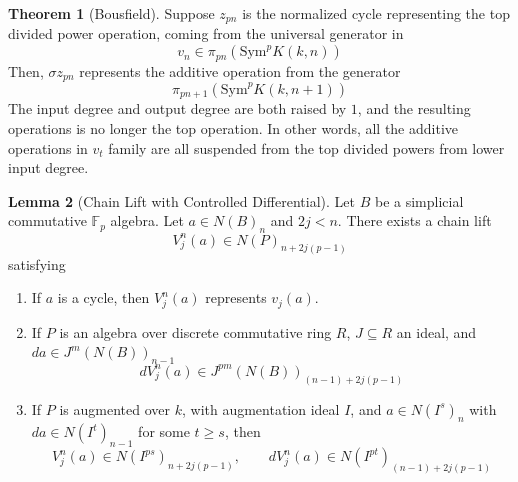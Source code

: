 \documentclass{article}
\newcommand{\Sym}{\textrm{Sym}}
\theoremstyle{definition}
\newtheorem{theorem}{Theorem}[section]
\theoremstyle{definition}
\theoremstyle{definition}
\theoremstyle{definition}
\theoremstyle{definition}
\theoremstyle{definition}
\newtheorem{lemma}[theorem]{Lemma}
\theoremstyle{definition}
\theoremstyle{definition}
\begin{document}
\begin{theorem}[Bousfield]
    \label{suspended}
    Suppose $z_{pn}$ is the normalized cycle representing the top divided power operation, coming from the universal generator in 
    \[v_n\in \pi_{pn}(\Sym^p K(k,n))\] 
    Then, $\sigma z_{pn}$ represents the additive operation from the generator
    \[\pi_{pn+1}(\Sym^p K(k,n+1))\] 
    The input degree and output degree are both raised by $1$, and the resulting operations is no longer the top operation. In other words, all the additive operations in $v_t$ family are all suspended from the top divided powers from lower input degree. 
\end{theorem}

\begin{lemma}[Chain Lift with Controlled Differential]
\label{chain_lift}
Let $B$ be a simplicial commutative $\mathbb{F}_p$ algebra. Let $a\in N(B)_{n}$ and $2j<n$. There exists a chain lift 
\[V_j^n(a)\in N(P)_{n+2j(p-1)}\]
satisfying 
\begin{enumerate}
    \item If $a$ is a cycle, then $V_j^n(a)$ represents $v_j(a)$. 
    \item If $P$ is an algebra over discrete commutative ring $R$, $J\subseteq R$ an ideal, and $da\in J^m(N(B))_{n-1}$
    \[dV_j^n(a)\in J^{pm}(N(B))_{(n-1)+2j(p-1)} \]
    \item If $P$ is augmented over $k$, with augmentation ideal $I$, and 
    $a\in N(I^s)_n$ with $da\in N(I^t)_{n-1}$ for some $t\geq s$, then 
    \[V_j^n(a)\in N(I^{ps})_{n+2j(p-1)}, \quad \quad dV_j^n(a)\in N(I^{pt})_{(n-1)+2j(p-1)}\]
\end{enumerate}















\end{lemma}
\end{document}
